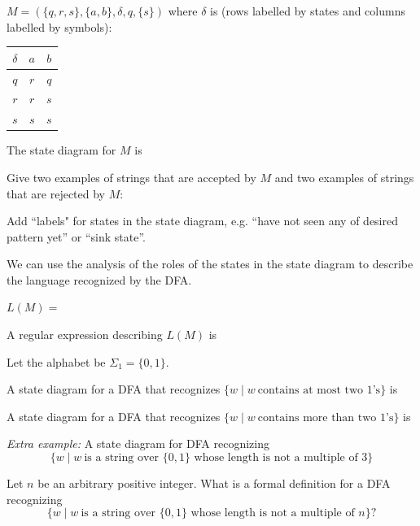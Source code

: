 \documentclass[12pt, oneside]{article}
\begin{document}
$M = ( \{ q, r, s\}, \{a,b\}, \delta, q, \{s\} )$ 
where $\delta$ is  (rows labelled by states
and columns labelled by symbols):
\begin{center}
\begin{tabular}{c|cc}
$\delta$ & $a$ & $b$ \\
\hline
$q$ & $r$ & $q$ \\
$r$ & $r$ & $s$ \\
$s$ & $s$ & $s$ \\
\end{tabular}
\end{center}

The state diagram for $M$ is 

\vfill



Give two examples of strings that are accepted by $M$ and two examples of strings that are rejected by $M$:

\vfill

Add ``labels" for states in the state diagram, e.g. ``have not seen any of desired pattern yet'' or
``sink state''.
\newpage

We can use the analysis of the roles of the states in the state diagram to describe the language
recognized by the DFA. 


$L(M) = $

A regular expression describing $L(M)$ is




\vspace{300pt}

Let the alphabet be $\Sigma_1 = \{0,1\}$.

A state diagram for a DFA that recognizes $\{w \mid w~\text{contains at most two $1$'s} \}$ is

\vspace{70pt}

A state diagram for a DFA that recognizes $\{w \mid w~\text{contains more than two $1$'s} \}$ is

\vspace{70pt}


\newpage
{\it Extra example:} A state diagram for DFA recognizing
$$\{w \mid w~\text{is a string over $\{0,1\}$ whose length is not a multiple of $3$} \}$$

\vspace{70pt}


Let $n$ be an arbitrary positive integer. What is a formal definition for a DFA recognizing
\[
\{w \mid w~\text{is a string over $\{0,1\}$ whose length is not a multiple of $n$} \}?
\]
\end{document}
